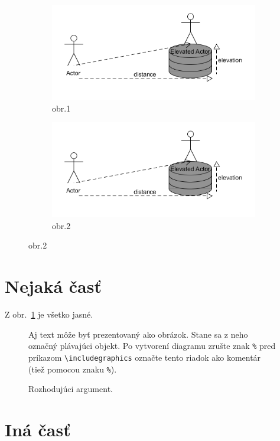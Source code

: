 \documentclass[10pt,twocolumn,twoside,slovak,english,a4paper]{article}
\begin{document}
\begin{figure}
\caption{Dva obr. vedl’a seba}\label{fig:animals}
\begin{subfigure}[b]{0.3\textwidth}
\centering
\includegraphics[scale=0.1]{diagram1}
\caption{obr.1}
\end{subfigure}
\begin{subfigure}[b]{0.3\textwidth}
\centering
\includegraphics[scale=0.1]{diagram1}
\caption{obr.2}
\end{subfigure}
\end{figure}

\section{Nejaká časť} \label{nejaka}

Z obr.~\ref{f:rozhod} je všetko jasné. 

\begin{figure}[tbh]
\centering
Aj text môže byť prezentovaný ako obrázok. Stane sa z neho označný plávajúci objekt. Po vytvorení diagramu zrušte znak \texttt{\%} pred príkazom \verb|\includegraphics| označte tento riadok ako komentár (tiež pomocou znaku \texttt{\%}).
\caption{Rozhodujúci argument.}
\label{f:rozhod}
\end{figure}



\section{Iná časť} \label{ina}
\end{document}
